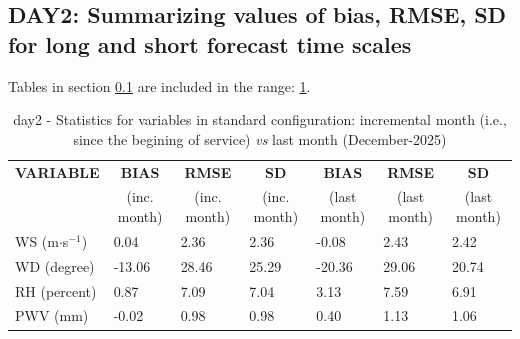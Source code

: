 \subsection{DAY2: Summarizing values of bias, RMSE, SD for long and short forecast time scales}\label{subsec:day2:stat}
Tables in section \ref{subsec:day2:stat} are included in the range: \ref{tab:day2:statBEF}.
\begin{table}[h!]
\begin{center}
\begin{tabular}{|l|l|l|l|l|l|l|}
\hline
\multicolumn{1}{|c|}{\cellcolor[HTML]{C0C0C0}\textbf{VARIABLE}} & \multicolumn{1}{c|}{\cellcolor[HTML]{C0C0C0}\textbf{BIAS}} & \multicolumn{1}{c|}{\cellcolor[HTML]{C0C0C0}\textbf{RMSE}} & \multicolumn{1}{c|}{\cellcolor[HTML]{C0C0C0}\textbf{SD}} & \multicolumn{1}{c|}{\cellcolor[HTML]{C0C0C0}\textbf{BIAS}} & \multicolumn{1}{c|}{\cellcolor[HTML]{C0C0C0}\textbf{RMSE}} & \multicolumn{1}{c|}{\cellcolor[HTML]{C0C0C0}\textbf{SD}}\\
\multicolumn{1}{|c|}{\cellcolor[HTML]{C0C0C0}} & \multicolumn{1}{c|}{\cellcolor[HTML]{C0C0C0}(inc. month)} & \multicolumn{1}{c|}{\cellcolor[HTML]{C0C0C0}(inc. month)} & \multicolumn{1}{c|}{\cellcolor[HTML]{C0C0C0}(inc. month)} & \multicolumn{1}{c|}{\cellcolor[HTML]{C0C0C0}(last month)} & \multicolumn{1}{c|}{\cellcolor[HTML]{C0C0C0}(last month)} & \multicolumn{1}{c|}{\cellcolor[HTML]{C0C0C0}(last month)}\\\hline
\cellcolor[HTML]{C0C0C0}WS (m$\cdot$s$^{-1}$) &      0.04  &      2.36  &      2.36  &     -0.08     &      2.43     &      2.42\\
\cellcolor[HTML]{C0C0C0}WD (degree)           &    -13.06  &     28.46  &     25.29  &    -20.36     &     29.06     &     20.74\\
\cellcolor[HTML]{C0C0C0}RH (percent)          &      0.87  &      7.09  &      7.04  &      3.13     &      7.59     &      6.91\\
\cellcolor[HTML]{C0C0C0}PWV (mm)              &     -0.02 &      0.98 &      0.98 &      0.40    &      1.13    &      1.06\\
\hline
\end{tabular}
\caption{day2 - Statistics for variables in standard configuration: incremental month (i.e., since the begining of service) \textit{vs} last month (December-2025)}\label{tab:day2:statBEF}
\end{center}
\end{table}

